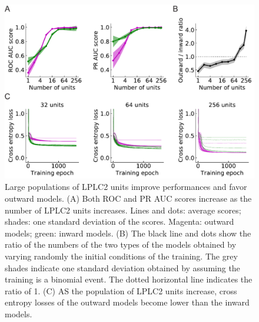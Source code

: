 \documentclass[pdftex,9pt,lineno]{elife}
\begin{document}
\begin{figure}
\includegraphics[width=\linewidth]{figures/outward_better_than_inward_paper.pdf}
\caption{Large populations of LPLC2 units improve performances and favor outward models. (A) Both ROC and PR AUC scores increase as the number of LPLC2 units increases. Lines and dots: average scores; shades: one standard deviation of the scores. Magenta: outward models; green: inward models. (B) The black line and dots show the ratio of the numbers of the two types of the models obtained by varying randomly the initial conditions of the training. The grey shades indicate one standard deviation obtained by assuming the training is a binomial event. The dotted horizontal line indicates the ratio of 1. (C) AS the population of LPLC2 units increase, cross entropy losses of the outward models become lower than the inward models.}
\label{fig:outward_prevail}

\end{figure}
\end{document}
